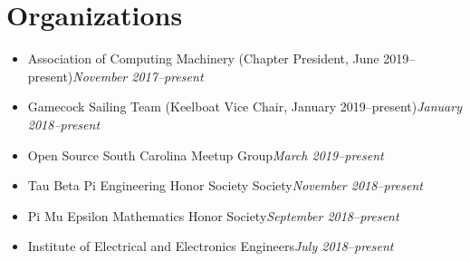 \documentclass[\ifdefined\cv11pt\else10pt\fi,letterpaper,roman]{moderncv}
\newcommand{\cvonly}[1]{\ifdefined\cv#1\fi}
\renewcommand{\cvitem}[2]{\item {#1}\hfill\textit{#2}}
\let\oldsection\section
\renewcommand{\section}[1]{\vspace*{-1.3ex}\oldsection{#1}\vspace*{-0.5ex}}
\begin{document}
	\section{\textbf{Organizations}}
	\begin{itemize}
		\cvitem{Association of Computing Machinery (Chapter President, June 2019--present)}{November 2017--present}
		\cvitem{Gamecock Sailing Team (Keelboat Vice Chair, January 2019--present)}{January 2018--present}
		\cvitem{Open Source South Carolina Meetup Group}{March 2019--present}
		\cvitem{Tau Beta Pi Engineering Honor Society Society}{November 2018--present}
		\cvitem{Pi Mu Epsilon Mathematics Honor Society}{September 2018--present}
		\cvitem{Institute of Electrical and Electronics Engineers}{July 2018--present}
	\end{itemize}
	
	\setlength{\premulticols}{0pt}
\end{document}
